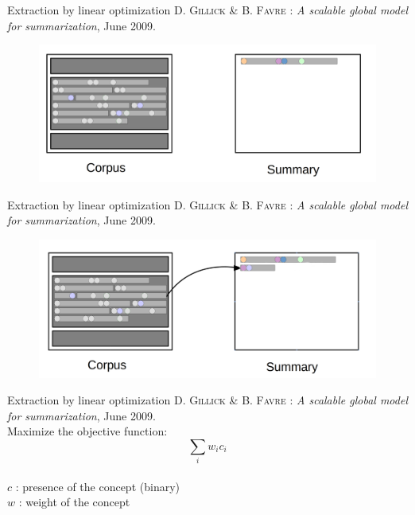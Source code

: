 \documentclass[xcolor=x11names,compress]{beamer}
\renewcommand{\(}{\begin{columns}}
\renewcommand{\)}{\end{columns}}
\newcommand{\<}[1]{\begin{column}{#1}}
\renewcommand{\>}{\end{column}}
\begin{document}
\begin{frame}{Extraction by linear optimization}
\textsc{D. Gillick} \& \textsc{B. Favre} : \textit{A scalable global model for summarization}, June 2009.\\
\vspace{1cm}
	\begin{figure}[!h]
    	\includegraphics[scale=0.25]{3.png}
    \end{figure}
\end{frame}


\begin{frame}{Extraction by linear optimization}
\textsc{D. Gillick} \& \textsc{B. Favre} : \textit{A scalable global model for summarization}, June 2009.\\
\vspace{1cm}
	\begin{figure}[!h]
    	\includegraphics[scale=0.25]{4.png}
    \end{figure}
\end{frame}


\begin{frame}{Extraction by linear optimization}
\textsc{D. Gillick} \& \textsc{B. Favre} : \textit{A scalable global model for summarization}, June 2009.\\
\vspace{1cm}
Maximize the objective function:\\
\[\sum_{i} w_i c_i\]\\
$c$ : presence of the concept (binary)\\
$w$ : weight of the concept
\end{frame}
\end{document}
